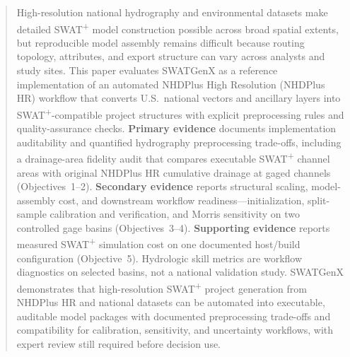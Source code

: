 \begin{abstract}
High-resolution national hydrography and environmental datasets make detailed SWAT\textsuperscript{+} model construction possible across broad spatial extents, but reproducible model assembly remains difficult because routing topology, attributes, and export structure can vary across analysts and study sites.
This paper evaluates SWATGenX as a reference implementation of an automated NHDPlus High Resolution (NHDPlus HR) workflow that converts U.S.\ national vectors and ancillary layers into SWAT\textsuperscript{+}-compatible project structures with explicit preprocessing rules and quality-assurance checks.
\textbf{Primary evidence} documents implementation auditability and quantified hydrography preprocessing trade-offs, including a drainage-area fidelity audit that compares executable SWAT\textsuperscript{+} channel areas with original NHDPlus HR cumulative drainage at gaged channels (Objectives~1--2).
\textbf{Secondary evidence} reports structural scaling, model-assembly cost, and downstream workflow readiness---initialization, split-sample calibration and verification, and Morris sensitivity on two controlled gage basins (Objectives~3--4).
\textbf{Supporting evidence} reports measured SWAT\textsuperscript{+} simulation cost on one documented host/build configuration (Objective~5).
Hydrologic skill metrics are workflow diagnostics on selected basins, not a national validation study.
SWATGenX demonstrates that high-resolution SWAT\textsuperscript{+} project generation from NHDPlus HR and national datasets can be automated into executable, auditable model packages with documented preprocessing trade-offs and compatibility for calibration, sensitivity, and uncertainty workflows, with expert review still required before decision use.
\end{abstract}

